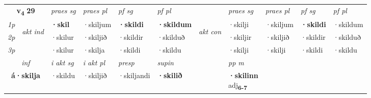 \noindent
\begin{tabular}{lllllllllll} \toprule
\multicolumn{2}{c}{\textbf{v{\textsubscript{4}}} \Large{\textbf{29}}}  &  \textit{praes sg}  & \textit{praes pl}  &\textit{ pf sg} & \textit{pf pl} &  &  \textit{praes sg}  & \textit{praes pl}  & \textit{pf sg} & \textit{pf pl } \\*
	\cmidrule{3-6} \cmidrule{8-11}
 {\textit{1p}} & \multirow{3}{*}{\begin{turn}{90}\textit{akt ind}\end{turn}} & \textbf{·skil} & ·skiljum & \textbf{·skildi} & \textbf{·skildum} & \multirow{3}{*}{\begin{turn}{90}\textit{akt con}\end{turn}} &·skilji & ·skiljum & \textbf{·skildi} & ·skildum\\*
 {\textit{2p}} &  &  ·skilur  & ·skiljið & ·skildir & ·skilduð & & ·skiljir & ·skiljið & ·skildir & ·skilduð \\*
{\textit{3p}} &  & ·skilur & ·skilja & ·skildi & ·skildu & & ·skilji & ·skilji& ·skildi & ·skildu \\*
\cmidrule{3-6} \cmidrule{8-11}

   \multicolumn{2}{c}{\textit{inf}}  & \textit{i akt sg} & \textit{i akt pl}   & \textit{presp} & \textit{supin}  && \textit{pp m} \\*
  \multicolumn{2}{c}{\textbf{á\allowbreak ·skilja}} & ·skildu  & ·skiljið   & ·skiljandi &  \textbf{·skilið}  && \specialcell{\textbf{·skilinn} \\ adj\textbf{\textsubscript{6-7}}} \\*
\end{tabular}

